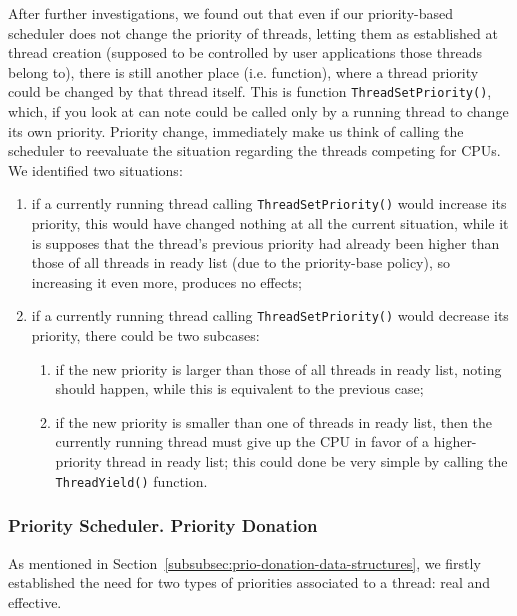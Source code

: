 After further investigations, we found out that even if our priority-based scheduler does not change the priority of threads, letting them as established at thread creation (supposed to be controlled by user applications those threads belong to), there is still another place (i.e. function), where a thread priority could be changed by that thread itself. This is function \lstinline|ThreadSetPriority()|, which, if you look at can note could be called only by a running thread to change its own priority. Priority change, immediately make us think of calling the scheduler to reevaluate the situation regarding the threads competing for CPUs. We identified two situations:
\begin{enumerate}
    \item if a currently running thread calling \lstinline|ThreadSetPriority()| would increase its priority, this would have changed nothing at all the current situation, while it is supposes that the thread's previous priority had already been higher than those of all threads in ready list (due to the priority-base policy), so increasing it even more, produces no effects;
    
    \item if a currently running thread calling \lstinline|ThreadSetPriority()| would decrease its priority, there could be two subcases:
        \begin{enumerate}
            \item if the new priority is larger than those of all threads in ready list, noting should happen, while this is equivalent to the previous case;
            
            \item if the new priority is smaller than one of threads in ready list, then the currently running thread must give up the CPU in favor of a higher-priority thread in ready list; this could done be very simple by calling the \lstinline|ThreadYield()| function.
        \end{enumerate}

\end{enumerate}


\subsubsection{Priority Scheduler. Priority Donation}
\label{subsubsec:prio-donation-analysis-and-design}

As mentioned in Section~\ref{subsubsec:prio-donation-data-structures}, we firstly established the need for two types of priorities associated to a thread: real and effective. 

